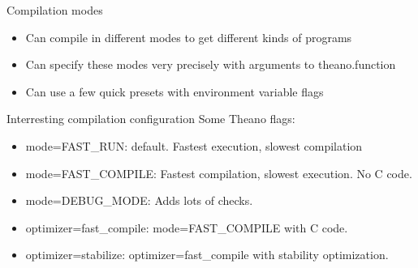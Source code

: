 \documentclass[utf8x,xcolor=pdftex,dvipsnames,table]{beamer}
\begin{document}

\begin{frame}{Compilation modes}
  \begin{itemize}
  \item Can compile in different modes to get different kinds of programs
  \item Can specify these modes very precisely with arguments to theano.function
  \item Can use a few quick presets with environment variable flags
  \end{itemize}
\end{frame}

\begin{frame}{Interresting compilation configuration}
  Some Theano flags:
  \begin{itemize}
  \item mode=FAST\_RUN: default. Fastest execution, slowest compilation
  \item mode=FAST\_COMPILE: Fastest compilation, slowest execution. No C code.
  \item mode=DEBUG\_MODE: Adds lots of checks.
  \item optimizer=fast\_compile: mode=FAST\_COMPILE with C code.
  \item optimizer=stabilize: optimizer=fast\_compile with stability optimization.
  \end{itemize}
\end{frame}
\end{document}
